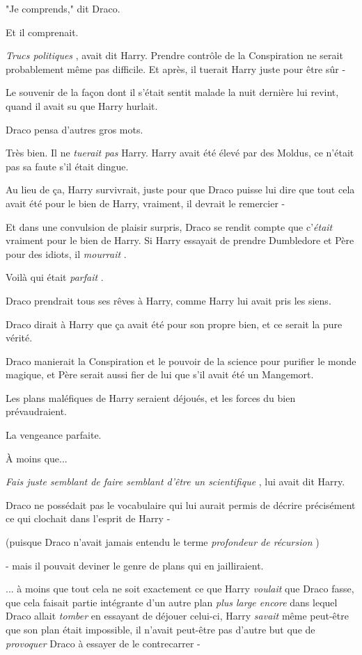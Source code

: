 "Je comprends," dit Draco.

Et il comprenait.

\emph{Trucs politiques} , avait dit Harry. Prendre contrôle de la Conspiration ne serait probablement même pas difficile. Et après, il tuerait Harry juste pour être sûr -

Le souvenir de la façon dont il s'était sentit malade la nuit dernière lui revint, quand il avait su que Harry hurlait.

Draco pensa d'autres gros mots.

Très bien. Il ne \emph{tuerait pas}  Harry. Harry avait été élevé par des Moldus, ce n'était pas sa faute s'il était dingue.

Au lieu de ça, Harry survivrait, juste pour que Draco puisse lui dire que tout cela avait été pour le bien de Harry, vraiment, il devrait le remercier -

Et dans une convulsion de plaisir surpris, Draco se rendit compte que c'\emph{était}  vraiment pour le bien de Harry. Si Harry essayait de prendre Dumbledore et Père pour des idiots, il \emph{mourrait} .

Voilà qui était \emph{parfait} .

Draco prendrait tous ses rêves à Harry, comme Harry lui avait pris les siens.

Draco dirait à Harry que ça avait été pour son propre bien, et ce serait la pure vérité.

Draco manierait la Conspiration et le pouvoir de la science pour purifier le monde magique, et Père serait aussi fier de lui que s'il avait été un Mangemort.

Les plans maléfiques de Harry seraient déjoués, et les forces du bien prévaudraient.

La vengeance parfaite.

À moins que...

\emph{Fais juste semblant de faire semblant d'être un scientifique} , lui avait dit Harry.

Draco ne possédait pas le vocabulaire qui lui aurait permis de décrire précisément ce qui clochait dans l'esprit de Harry -

(puisque Draco n'avait jamais entendu le terme \emph{profondeur de récursion} )

- mais il pouvait deviner le genre de plans qui en jailliraient.

... à moins que tout cela ne soit exactement ce que Harry \emph{voulait}  que Draco fasse, que cela faisait partie intégrante d'un autre plan \emph{plus large encore}  dans lequel Draco allait \emph{tomber}  en essayant de déjouer celui-ci, Harry \emph{savait}  même peut-être que son plan était impossible, il n'avait peut-être pas d'autre but que de \emph{provoquer}  Draco à essayer de le contrecarrer -

